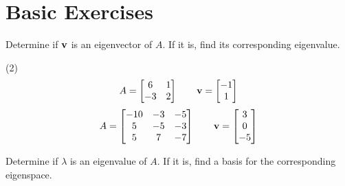 \section{Basic Exercises}

Determine if $\mathbf v$ is an eigenvector of $A$.  If it is, find its
corresponding eigenvalue.
\begin{tasks}[style=enumerate](2)
\task
  \begin{displaymath}
    A =
    \begin{bmatrix}
      6 & 1 \\
      -3 & 2
    \end{bmatrix}
    \qquad
    \mathbf v =  \begin{bmatrix} -1 \\ 1 \end{bmatrix} 
  \end{displaymath}
\task
  \begin{displaymath}
    A =
    \begin{bmatrix}
      -10 & -3 & -5 \\
      5 & -5 & -3 \\
      5 & 7 & -7
    \end{bmatrix}
    \qquad
    \mathbf v =  \begin{bmatrix} 3 \\ 0 \\ -5 \end{bmatrix} 
\end{displaymath}
\end{tasks}
Determine if $\lambda$ is an eigenvalue of $A$.
If it is, find a basis for the corresponding eigenspace.
